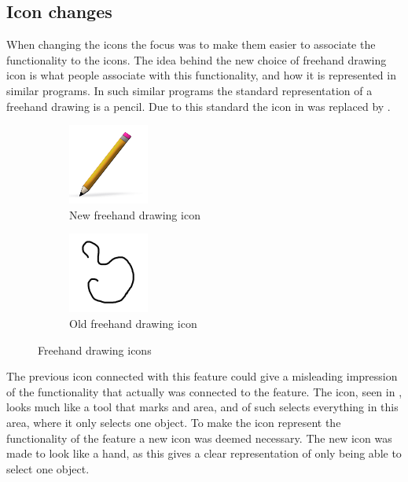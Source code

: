 \subsection{Icon changes}
When changing the icons the focus was to make them easier to associate the functionality to the icons.
The idea behind the new choice of freehand drawing icon is what people associate with this functionality, and how it is represented in similar programs.
In such similar programs the standard representation of a freehand drawing is a pencil.
Due to this standard the icon in  was replaced by .

\begin{figure}[h]
	\centering
	\begin{subfigure}[b]{0.45\textwidth}
		\centering
		\includegraphics[scale = 1]{media/freehandNew}
		\caption{New freehand drawing icon}
		\label{figure:new-freehand}
	\end{subfigure}
	\qquad
	\begin{subfigure}[b]{0.45\textwidth}
		\centering
		\includegraphics[scale = 0.1]{media/freehandOld}
		\caption{Old freehand drawing icon}
		\label{figure:old-freehand}
	\end{subfigure}
	\caption{Freehand drawing icons}
	\label{figure:freehand}
\end{figure}

The previous icon connected with this feature could give a misleading impression of the functionality that actually was connected to the feature.
The icon, seen in , looks much like a tool that marks and area, and of such selects everything in this area, where it only selects one object.
To make the icon represent the functionality of the feature a new icon was deemed necessary.
The new icon was made to look like a hand,  as this gives a clear representation of only being able to select one object.


